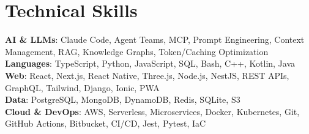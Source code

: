 \section{Technical Skills}
\begin{itemize}[leftmargin=0.15in, label={}]
  \small{\item{
    \textbf{AI \& LLMs}{:
      Claude Code, Agent Teams, MCP, Prompt Engineering, Context Management,
      RAG, Knowledge Graphs, Token/Caching Optimization
    } \\
    \textbf{Languages}{:
      TypeScript, Python, JavaScript, SQL, Bash, C++, Kotlin, Java
    } \\
    \textbf{Web}{:
      React, Next.js, React Native, Three.js, Node.js, NestJS, REST APIs,
      GraphQL, Tailwind, Django, Ionic, PWA
    } \\
    \textbf{Data}{:
      PostgreSQL, MongoDB, DynamoDB, Redis, SQLite, S3
    } \\
    \textbf{Cloud \& DevOps}{:
      AWS, Serverless, Microservices, Docker, Kubernetes, Git, GitHub Actions,
      Bitbucket, CI/CD, Jest, Pytest, IaC
    } \\
  }}
\end{itemize}
